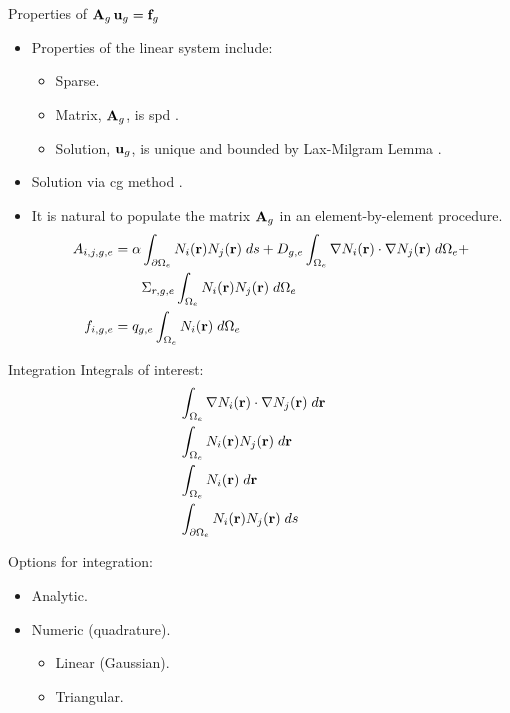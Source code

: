 \begin{frame}{Properties of $\mathbf{A}_g \, \mathbf{u}_g = \mathbf{f}_g$}
  \begin{itemize}
    \item Properties of the linear system include:
      \begin{itemize}
        \item Sparse.
        \item Matrix, $\mathbf{A}_g$, is \gls{spd} \cite{textbookhughes}.
        \item Solution, $\mathbf{u}_g$, is unique and bounded by Lax-Milgram Lemma 
          \cite{textbookli}.
      \end{itemize}
    \item Solution via \gls{cg} method \cite{Kelley1995IterativeEquations}.
    \item It is natural to populate the matrix $\mathbf{A}_g$ in an element-by-element 
      procedure.
      \begin{align}
        \label{eq:matrix_population}
        A_{i,j,g,e} &= \alpha \int_{\partial \Omega_e} N_i(\mathbf{r}) 
          N_j(\mathbf{r}) \; ds + D_{g,e} 
          \int_{\Omega_e} \mathbf{\nabla} N_i(\mathbf{r}) \cdot \mathbf{\nabla} N_j(\mathbf{r}) \;
          d\Omega_e + \\
        &\qquad \Sigma_{r,g,e} \int_{\Omega_e} N_i(\mathbf{r}) N_j(\mathbf{r})
          \; d\Omega_e \\
        \label{eq:vector_population}
        f_{i,g,e} &= q_{g,e} \int_{\Omega_e} N_i(\mathbf{r}) \;d\Omega_e
      \end{align}
  \end{itemize}
\end{frame}

\begin{frame}{Integration}
  Integrals of interest:
  \begin{align}
    &\int_{\Omega_e} \mathbf{\nabla} N_i(\mathbf{r}) \cdot \mathbf{\nabla} N_j(\mathbf{r}) 
      \;d\mathbf{r} \\
    &\int_{\Omega_e} N_i(\mathbf{r}) N_j(\mathbf{r}) \;d\mathbf{r} \\
    &\int_{\Omega_e} N_i(\mathbf{r}) \;d\mathbf{r} \\
    &\int_{\partial \Omega_e} N_i(\mathbf{r}) N_j(\mathbf{r}) \;ds &
  \end{align}

  Options for integration:
  \begin{itemize}
    \item Analytic.
    \item Numeric (quadrature).
    \begin{itemize}
      \item Linear (Gaussian).
      \item Triangular.
    \end{itemize}
  \end{itemize}
\end{frame}

